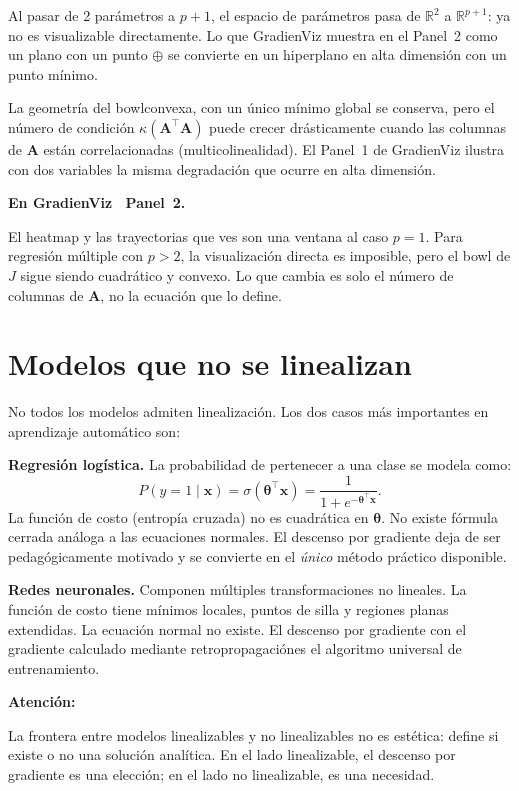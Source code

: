 \documentclass[12pt, a4paper]{article}
\newenvironment{viznota}[1]{%
    \begin{mdframed}[style=vizverde]
    \textbf{\color{bordeteo}En GradienViz \textemdash\ #1.}\quad
}{%
    \end{mdframed}
}
\newenvironment{vizadv}{%
    \begin{mdframed}[style=viznaranja]
    \textbf{\color{bordeadv}Atención:}\quad
}{%
    \end{mdframed}
}
\newcommand{\R}{\mathbb{R}}
\newcommand{\T}{{\top}}
\newcommand{\btheta}{\boldsymbol{\theta}}
\begin{document}
Al pasar de 2 parámetros a $p+1$, el espacio de parámetros pasa de
$\R^2$ a $\R^{p+1}$: ya no es visualizable directamente. Lo que
GradienViz muestra en el Panel~2 como un plano con un punto $\oplus$
se convierte en un hiperplano en alta dimensión con un punto mínimo.

La geometría del bowl\textemdash convexa, con un único mínimo global\textemdash
se conserva, pero el número de condición $\kappa(\mathbf{A}^\T\mathbf{A})$
puede crecer drásticamente cuando las columnas de $\mathbf{A}$ están
correlacionadas (multicolinealidad). El Panel~1 de GradienViz ilustra
con dos variables la misma degradación que ocurre en alta dimensión.

\begin{viznota}{Panel~2}
El heatmap y las trayectorias que ves son una ventana al caso $p=1$.
Para regresión múltiple con $p > 2$, la visualización directa es imposible,
pero el bowl de $J$ sigue siendo cuadrático y convexo. Lo que cambia
es solo el número de columnas de $\mathbf{A}$, no la ecuación que lo define.
\end{viznota}

\section{Modelos que no se linealizan}

No todos los modelos admiten linealización. Los dos casos más importantes
en aprendizaje automático son:

\textbf{Regresión logística.} La probabilidad de pertenecer a una clase
se modela como:
\[
    P(y=1 \mid \mathbf{x}) = \sigma(\btheta^\T \mathbf{x})
    = \frac{1}{1 + e^{-\btheta^\T \mathbf{x}}}.
\]
La función de costo (entropía cruzada) no es cuadrática en $\btheta$.
No existe fórmula cerrada análoga a las ecuaciones normales. El descenso
por gradiente deja de ser pedagógicamente motivado y se convierte en el
\emph{único} método práctico disponible.

\textbf{Redes neuronales.} Componen múltiples transformaciones no lineales.
La función de costo tiene mínimos locales, puntos de silla y regiones
planas extendidas. La ecuación normal no existe. El descenso por gradiente\textemdash
con el gradiente calculado mediante retropropagación\textemdash es el
algoritmo universal de entrenamiento.

\begin{vizadv}
La frontera entre modelos linealizables y no linealizables no es estética:
define si existe o no una solución analítica. En el lado linealizable,
el descenso por gradiente es una elección; en el lado no linealizable,
es una necesidad.
\end{vizadv}
\end{document}
